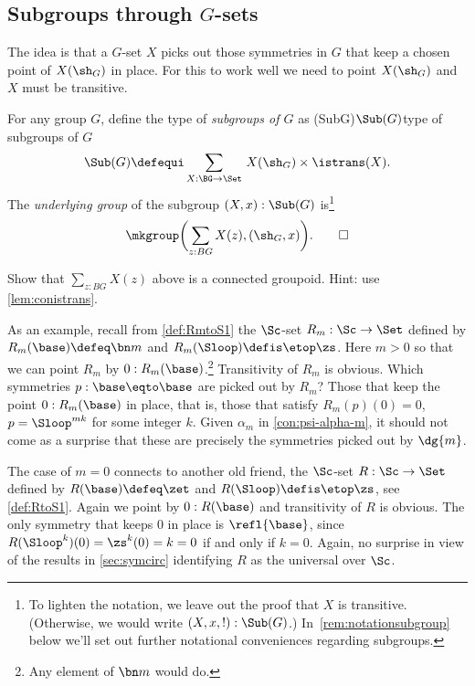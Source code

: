 \subsection{Subgroups through $G$-sets}

The idea is that a $G$-set $X$ picks out those symmetries in $G$
that keep a chosen point of $X(\sh_G)$ in place. For this to work well
we need to point $X(\sh_G)$ and $X$ must be transitive.

\begin{definition}\label{def:set-of-subgroups}
  For any group $G$, define the type of \emph{subgroups of $G$} as%
  \glossary(SubG){$\protect\Sub(G)$}{type of subgroups of $G$}
  \[
    \Sub(G)\defequi\sum_{X:\BG\to\Set}{\,}X(\sh_G)
    \times\istrans(X).
  \]
  The \emph{underlying group} of the subgroup $(X,x) : \Sub(G)$ is\footnote{%
    To lighten the notation, we leave out the proof that $X$ is transitive.
    (Otherwise, we would write $(X,x,!):\Sub(G)$.)
    In~\cref{rem:notationsubgroup} below we'll set out further notational conveniences
    regarding subgroups.}
  \[
    \mkgroup \biggl(\sum_{z:BG}X(z),(\sh_G,x)\biggr).\qedhere
  \]
\end{definition}

\begin{xca}\label{xca:group-Xx!}
Show that $\sum_{z:BG}X(z)$ above is a connected groupoid.
Hint: use \cref{lem:conistrans}.
\end{xca}

As an example, recall from \cref{def:RmtoS1} the $\Sc$-set
$R_m : \Sc\to\Set$ defined by $R_m(\base) \defeq \bn m$ and
$R_m(\Sloop) \defis \etop\zs$. Here $m>0$ so that we can point
$R_m$ by $0: R_m(\base)$.\footnote{Any element of $\bn m$ would do.}
Transitivity of $R_m$ is obvious.
Which symmetries $p: \base\eqto\base$ are picked out by $R_m$?
Those that keep the point $0: R_m(\base)$ in place, that is,
those that satisfy $R_m(p)(0)=0$, \ie $p=\Sloop^{mk}$ for some integer $k$.
Given $\alpha_m$ in \cref{con:psi-alpha-m}, it should not come as a
surprise that these are precisely the symmetries picked out by $\dg{m}$.

The case of $m=0$ connects to another old friend, the $\Sc$-set
$R : \Sc\to\Set$ defined by $R(\base) \defeq \zet$ and
$R(\Sloop) \defis \etop\zs$, see \cref{def:RtoS1}.
Again we point by $0: R(\base)$ and transitivity of $R$ is obvious.
The only symmetry that keeps $0$ in place is $\refl{\base}$,
since $R(\Sloop^k)(0) = \zs^k(0) = k = 0$ if and only if $k=0$.
Again, no surprise in view of the results in \cref{sec:symcirc}
identifying $R$ as the universal \covering over $\Sc$.

